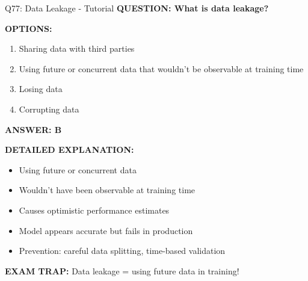\documentclass[8pt]{beamer}
\begin{document}
	\begin{frame}{Q77: Data Leakage - Tutorial}
		\fontsize{6.5}{7.5}\selectfont
		\textbf{QUESTION: What is data leakage?}
		
		\vspace{0.1cm}
		\textbf{OPTIONS:}
		\begin{enumerate}
			\item Sharing data with third parties
			\item Using future or concurrent data that wouldn't be observable at training time
			\item Losing data
			\item Corrupting data
		\end{enumerate}
		
		\vspace{0.1cm}
		\textcolor{myblue}{\textbf{ANSWER: B}}
		
		\vspace{0.1cm}
		\textbf{DETAILED EXPLANATION:}
		\begin{itemize}
			\item Using future or concurrent data
			\item Wouldn't have been observable at training time
			\item Causes optimistic performance estimates
			\item Model appears accurate but fails in production
			\item Prevention: careful data splitting, time-based validation
		\end{itemize}
		
		\vspace{0.1cm}
		\textcolor{myred}{\textbf{EXAM TRAP:}} Data leakage = \textcolor{myblue}{using future data in training}!
	\end{frame}
	
\end{document}
